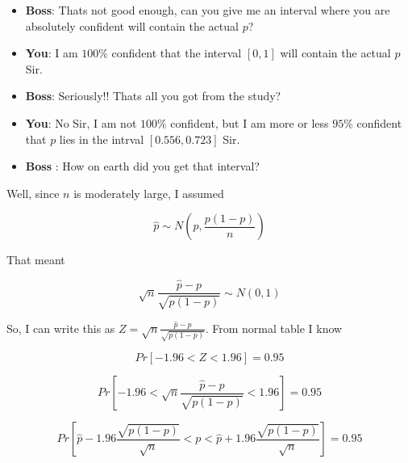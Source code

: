 \documentclass{beamer}\usepackage[]{graphicx}\usepackage[]{color}
\begin{document}
\begin{frame}[fragile]

\begin{itemize}
\item \textbf{Boss}: Thats not good enough, can you give me an interval where you are absolutely confident will contain the actual $p$?  \pause

\item \textbf{You}: I am $100 \%$ confident that the interval $[0,1]$ will contain the actual $p$ Sir. \pause

\item \textbf{Boss}: Seriously!! Thats all you got from the study?  \pause

\item \textbf{You}: No Sir, I am not $100 \%$ confident, but I am more or less $95\%$ confident that $p$ lies in the intrval $\left [0.556, 0.723 \right] $ Sir. \pause

\item \textbf{Boss} : How on earth did you get that interval?  \pause

\end{itemize}

\end{frame}


\begin{frame}[fragile]

Well, since $n$ is moderately large, I assumed

$$ \hat{p} \sim N \left ( p, \frac{p(1-p)}{n} \right)  $$ \pause

That meant

$$ \sqrt{n} \frac{\hat{p} - p}{\sqrt{p(1-p)}} \sim N(0,1)  $$ \pause

So, I can write this as $Z = \sqrt{n} \frac{\hat{p} - p}{\sqrt{p(1-p)}}$. From normal table I know

$$ Pr [ - 1.96 < Z < 1.96] = 0.95 $$ \pause

$$ Pr [ - 1.96 < \sqrt{n} \frac{\hat{p} - p}{\sqrt{p(1-p)}}  < 1.96] = 0.95 $$ \pause

$$ Pr [ \hat{p} - 1.96 \frac{\sqrt{p(1-p)}}{\sqrt{n}} < p < \hat{p} + 1.96 \frac{\sqrt{p(1-p)}}{\sqrt{n}}  ] = 0.95 $$ \pause

\end{frame}
\end{document}
